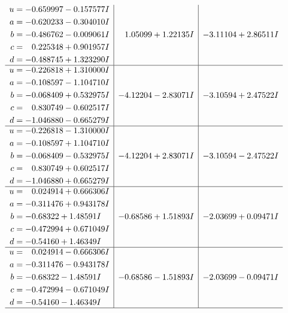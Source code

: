 \documentclass[1p]{elsarticle_modified}
\theoremstyle{definition}
\begin{document}
$$\begin{array}{c|c|c}
\begin{aligned}
u &= -0.659997 - 0.157577 I \\
a &= -0.620233 - 0.304010 I \\
b &= -0.486762 - 0.009061 I \\
c &= \phantom{-}0.225348 + 0.901957 I \\
d &= -0.488745 + 1.323290 I\end{aligned}
 & \phantom{-}1.05099 + 1.22135 I & -3.11104 + 2.86511 I \\ \hline\begin{aligned}
u &= -0.226818 + 1.310000 I \\
a &= -0.108597 - 1.104710 I \\
b &= -0.068409 + 0.532975 I \\
c &= \phantom{-}0.830749 - 0.602517 I \\
d &= -1.046880 - 0.665279 I\end{aligned}
 & -4.12204 - 2.83071 I & -3.10594 + 2.47522 I \\ \hline\begin{aligned}
u &= -0.226818 - 1.310000 I \\
a &= -0.108597 + 1.104710 I \\
b &= -0.068409 - 0.532975 I \\
c &= \phantom{-}0.830749 + 0.602517 I \\
d &= -1.046880 + 0.665279 I\end{aligned}
 & -4.12204 + 2.83071 I & -3.10594 - 2.47522 I \\ \hline\begin{aligned}
u &= \phantom{-}0.024914 + 0.666306 I \\
a &= -0.311476 + 0.943178 I \\
b &= -0.68322 + 1.48591 I \\
c &= -0.472994 + 0.671049 I \\
d &= -0.54160 + 1.46349 I\end{aligned}
 & -0.68586 + 1.51893 I & -2.03699 + 0.09471 I \\ \hline\begin{aligned}
u &= \phantom{-}0.024914 - 0.666306 I \\
a &= -0.311476 - 0.943178 I \\
b &= -0.68322 - 1.48591 I \\
c &= -0.472994 - 0.671049 I \\
d &= -0.54160 - 1.46349 I\end{aligned}
 & -0.68586 - 1.51893 I & -2.03699 - 0.09471 I\\
 \hline 
 \end{array}$$\newpage$$\begin{array}{c|c|c}  

\end{array}$$
\end{document}

